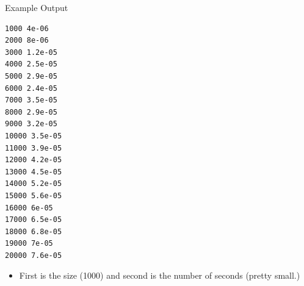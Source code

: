 \documentclass{beamer}
\begin{document}
\begin{frame}[fragile]{Example Output}
\begin{lstlisting}
1000 4e-06
2000 8e-06
3000 1.2e-05
4000 2.5e-05
5000 2.9e-05
6000 2.4e-05
7000 3.5e-05
8000 2.9e-05
9000 3.2e-05
10000 3.5e-05
11000 3.9e-05
12000 4.2e-05
13000 4.5e-05
14000 5.2e-05
15000 5.6e-05
16000 6e-05
17000 6.5e-05
18000 6.8e-05
19000 7e-05
20000 7.6e-05
\end{lstlisting}
\begin{itemize}
\item First is the size (1000) and second is the number of seconds (pretty small.)
\end{itemize}
\end{frame}

\end{document}

